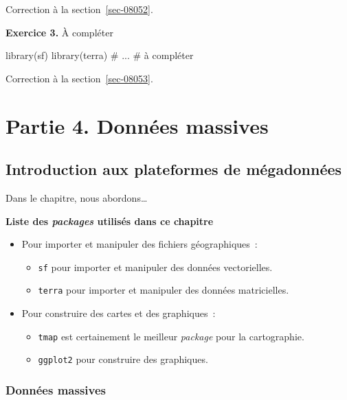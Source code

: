\documentclass[
  letterpaper,
  DIV=11,
  numbers=noendperiod]{scrreprt}
\newenvironment{Shaded}{\begin{snugshade}}{\end{snugshade}}
\newcommand{\CommentTok}[1]{\textcolor[rgb]{0.37,0.37,0.37}{#1}}
\newcommand{\NormalTok}[1]{\textcolor[rgb]{0.00,0.23,0.31}{#1}}
\providecommand{\tightlist}{%
  \setlength{\itemsep}{0pt}\setlength{\parskip}{0pt}}\usepackage{longtable,booktabs,array}
\begin{document}
Correction à la section~\ref{sec-08052}.

\textbf{Exercice 3.} À compléter

\begin{Shaded}
\begin{Highlighting}[]
\NormalTok{library(sf)}
\NormalTok{library(terra)}
\CommentTok{\# ...}
\CommentTok{\# à compléter}
\end{Highlighting}
\end{Shaded}

Correction à la section~\ref{sec-08053}.

\part{Partie 4. Données massives}


\chapter{Introduction aux plateformes de mégadonnées}\label{sec-chap07}

Dans le chapitre, nous abordons\ldots{}

\textbf{Liste des \emph{packages} utilisés dans ce chapitre}

\begin{itemize}
\tightlist
\item
  Pour importer et manipuler des fichiers géographiques~:

  \begin{itemize}
  \tightlist
  \item
    \texttt{sf} pour importer et manipuler des données vectorielles.
  \item
    \texttt{terra} pour importer et manipuler des données matricielles.
  \end{itemize}
\item
  Pour construire des cartes et des graphiques~:

  \begin{itemize}
  \tightlist
  \item
    \texttt{tmap} est certainement le meilleur \emph{package} pour la
    cartographie.
  \item
    \texttt{ggplot2} pour construire des graphiques.
  \end{itemize}
\end{itemize}

\section{Données massives}\label{sec-071}
\end{document}
